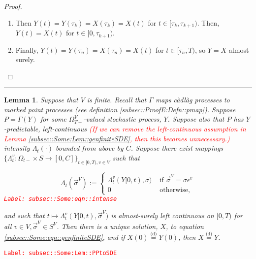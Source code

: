 \documentclass[12pt]{article}
\newcommand{\ra}{\rightarrow}
\newcommand{\te}{\text}
\newcommand{\ep}{\epsilon}
\newcommand{\tr}{\textcolor{red}}
\newcommand{\labe}[1]{\tr{\texttt{Label: #1}}}
\newcommand{\lin}{\rule{\linewidth}{0.4 pt}}
\newcommand{\deq}{\overset{\text{(d)}}{=}}			%
\renewcommand{\v}{v}							%
\renewcommand{\S}{S}							%
\newcommand{\s}{\sigma}							%
\newcommand{\sv}{\vec{\s}}						%
\newcommand{\ev}{\ep}							%
\newcommand{\T}{T}								%
\renewcommand{\t}{t}							%
\newcommand{\sset}{\Omega}						%
\newcommand{\X}{X}								%
\newcommand{\vind}[1]{^{#1}}					%
\newcommand{\carp}[1]{^{#1}}					%
\newcommand{\vsi}[1]{^{#1}}						%
\newcommand{\tp}[1]{(#1)}						%
\newcommand{\tip}[1]{#1}						%
\newcommand{\ts}[1]{_{#1}}						%
\newcommand{\const}{C}							%
\newcommand{\indx}[1]{_{#1}}					%
\newcommand{\XX}{Y}								%
\newcommand{\rt}{\tau}							%
\renewcommand{\it}{k}							%
\newcommand{\pmap}{\Gamma}						%
\newcommand{\rp}{P}								%
\newcommand{\ratee}{\Lambda}					%
\newtheorem{lem}[thms]{Lemma}
\begin{document}
\begin{proof}
\begin{enumerate}
\item Then \(\XX\tp{\t} = \XX\tp{\rt\indx{\it}} = \X\tp{\rt\indx{\it}} = \X\tp{\t}\) for \(\t \in [\rt\indx{\it},\rt\indx{\it+1})\). Then, \(\XX\tp{\t} = \X\tp{\t}\) for \(\t\in [0,\rt\indx{\it+1})\).

\item Finally, \(\XX\tp{\t} = \XX\tp{\rt\indx{n}} = \X\tp{\rt\indx{n}} = \X\tp{\t}\) for \(\t\in [\rt\indx{n},\T)\), so \(\XX = \X\) almost surely.
\end{enumerate}
\end{proof}

\lin

\begin{lem}
Suppose that \(V\) is finite. Recall that \(\pmap\) maps c\`adl\`ag processes to marked point processes (see definition \ref{subsec::ProofE:Defn::pmap}). Suppose \(\rp = \pmap(\XX)\) for some \(\sset\vsi{V}\ts{\T-}\)-valued stochastic process, \(\XX\). Suppose also that \(\rp\) has \(\XX\)-predictable, left-continuous \tr{(If we can remove the left-continuous assumption in Lemma \ref{subsec::Some:Lem::genfiniteSDE}, then this becomes unnecessary.)} intensity \(\ratee\ts{\t}(\cdot)\) bounded from above by \(\const\). Suppose there exist mappings \(\{\ratee\ts{\t}\vind{\v}:\sset\ts{\t-}\times \S \ra [0,\const]\}_{\t\in[0,\T),\v\in V}\) such that 

\begin{equation}
\ratee\ts{\t}(\sv\vsi{V}) := \begin{cases}
\ratee\ts{\t}\vind{\v}(\XX\tip{[0,\t)},\s) &\te{ if } \sv\vsi{V} = \s\ev\vind{\v}\\
0 &\te{ otherwise,}
\end{cases}
\label{subsec::Some:eqn::intense}
\end{equation}
\labe{subsec::Some:eqn::intense}

and such that \(\t\mapsto \ratee\ts{\t}\vind{\v}(\XX\tip{[0,\t)},\sv\vsi{V})\) is almost-surely left continuous on \([0,\T)\) for all \(\v\in V,\sv\vsi{V}\in \S\carp{V}\). Then there is a unique solution, \(\X\), to equation \eqref{subsec::Some:eqn::genfiniteSDE}, and if \(\X\tp{0} \deq \XX\tp{0}\), then \(\X \deq \XX\).

\label{subsec::Some:Lem::PPtoSDE}
\end{lem}
\labe{subsec::Some:Lem::PPtoSDE}
\end{document}
